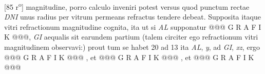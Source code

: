 [85 r\textsuperscript{o}]  magnitudine, porro calculo inveniri potest versus quod  punctum rectae \textit{DNI} unus  radius per vitrum permeans  refractus tendere debeat. Supposita itaque vitri refractionum  magnitudine cognita, ita ut si \textit{AL} supponatur @@@ G R A F I K @@@, \textit{GI} aequalis sit  earundem partium (talem circiter ego  refractionum vitri magnitudinem observavi:) prout tum  se habet 20 ad 13 ita \textit{AL}, \textit{y}, ad \textit{GI}, \textit{xz}, ergo @@@ G R A F I K @@@%
                    ,  et @@@ G R A F I K @@@%
                    , et @@@ G R A F I K @@@%
